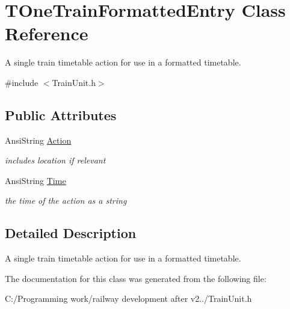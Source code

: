 \hypertarget{class_t_one_train_formatted_entry}{}\section{T\+One\+Train\+Formatted\+Entry Class Reference}
\label{class_t_one_train_formatted_entry}


A single train timetable action for use in a formatted timetable.  




{\ttfamily \#include $<$Train\+Unit.\+h$>$}

\subsection*{Public Attributes}
\begin{DoxyCompactItemize}
\item 
\mbox{\label{class_t_one_train_formatted_entry_aed96f14cc0862be5da673e206090e6d6}} 
Ansi\+String \mbox{\hyperlink{class_t_one_train_formatted_entry_aed96f14cc0862be5da673e206090e6d6}{Action}}
\begin{DoxyCompactList}\small\item\em includes location if relevant \end{DoxyCompactList}\item 
\mbox{\label{class_t_one_train_formatted_entry_a1731ee3ca7f8f0a0e7a5d048737bdeec}} 
Ansi\+String \mbox{\hyperlink{class_t_one_train_formatted_entry_a1731ee3ca7f8f0a0e7a5d048737bdeec}{Time}}
\begin{DoxyCompactList}\small\item\em the time of the action as a string \end{DoxyCompactList}\end{DoxyCompactItemize}


\subsection{Detailed Description}
A single train timetable action for use in a formatted timetable. 

The documentation for this class was generated from the following file\+:\begin{DoxyCompactItemize}
\item 
C\+:/\+Programming work/railway development after v2../Train\+Unit.\+h\end{DoxyCompactItemize}
